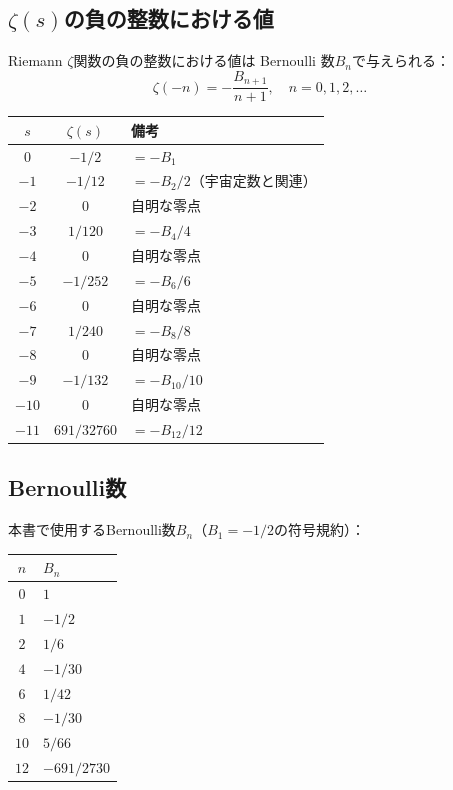 \documentclass[11pt,a4paper]{article}
\begin{document}
\subsection{$\zeta(s)$の負の整数における値}

Riemann $\zeta$関数の負の整数における値は Bernoulli 数$B_n$で与えられる：
\[
\zeta(-n) = -\frac{B_{n+1}}{n+1}, \quad n = 0, 1, 2, \ldots
\]

\begin{center}
\begin{tabular}{ccl}
\toprule
$s$ & $\zeta(s)$ & 備考 \\
\midrule
$0$ & $-1/2$ & $= -B_1$ \\
$-1$ & $-1/12$ & $= -B_2/2$（宇宙定数と関連） \\
$-2$ & $0$ & 自明な零点 \\
$-3$ & $1/120$ & $= -B_4/4$ \\
$-4$ & $0$ & 自明な零点 \\
$-5$ & $-1/252$ & $= -B_6/6$ \\
$-6$ & $0$ & 自明な零点 \\
$-7$ & $1/240$ & $= -B_8/8$ \\
$-8$ & $0$ & 自明な零点 \\
$-9$ & $-1/132$ & $= -B_{10}/10$ \\
$-10$ & $0$ & 自明な零点 \\
$-11$ & $691/32760$ & $= -B_{12}/12$ \\
\bottomrule
\end{tabular}
\end{center}


\subsection{Bernoulli数}

本書で使用するBernoulli数$B_n$（$B_1 = -1/2$の符号規約）：

\begin{center}
\begin{tabular}{cl}
\toprule
$n$ & $B_n$ \\
\midrule
$0$ & $1$ \\
$1$ & $-1/2$ \\
$2$ & $1/6$ \\
$4$ & $-1/30$ \\
$6$ & $1/42$ \\
$8$ & $-1/30$ \\
$10$ & $5/66$ \\
$12$ & $-691/2730$ \\
\bottomrule
\end{tabular}
\end{center}
\end{document}
